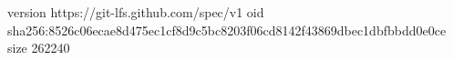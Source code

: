 version https://git-lfs.github.com/spec/v1
oid sha256:8526c06ecae8d475ec1cf8d9c5bc8203f06cd8142f43869dbec1dbfbbdd0e0ce
size 262240
